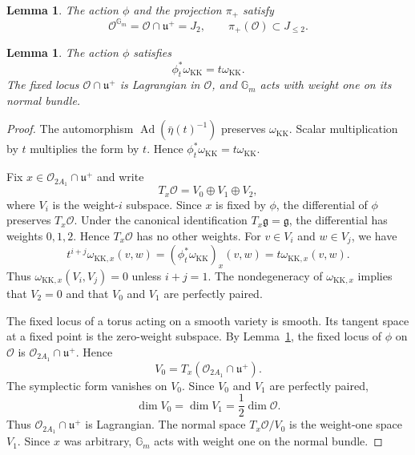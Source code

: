 \documentclass[10pt,a4paper]{amsart}
\newtheorem{lemma}[theorem]{Lemma}
\DeclareMathOperator{\Ad}{Ad}
\begin{document}
\begin{lemma}\label{fixed-data}
The action \(\phi\) and the projection \(\pi_+\) satisfy
\[
    \mathcal O^{\mathbb G_m}=\mathcal O\cap\mathfrak u^+=J_2,
    \qquad
    \pi_+(\mathcal O)\subset J_{\leq2}.
\]
\end{lemma}

\begin{lemma}\label{symplectic-weights}
The action \(\phi\) satisfies
\[
    \phi_t^*\omega_{\mathrm{KK}}=t\omega_{\mathrm{KK}}.
\]
The fixed locus \(\mathcal O\cap\mathfrak u^+\) is Lagrangian in \(\mathcal O\), and
\(\mathbb G_m\) acts with weight one on its normal bundle.
\end{lemma}

\begin{proof}
The automorphism \(\Ad(\bar\eta(t)^{-1})\) preserves
\(\omega_{\mathrm{KK}}\). Scalar multiplication by \(t\) multiplies the
form by \(t\). Hence
\(\phi_t^*\omega_{\mathrm{KK}}=t\omega_{\mathrm{KK}}\).

Fix \(x\in\mathcal O_{2A_1}\cap\mathfrak u^+\) and write
\[
    T_x\mathcal O=V_0\oplus V_1\oplus V_2,
\]
where \(V_i\) is the weight-\(i\) subspace. Since \(x\) is fixed by
\(\phi\), the differential of \(\phi\) preserves \(T_x\mathcal O\). Under the
canonical identification \(T_x\mathfrak g=\mathfrak g\), the differential
has weights \(0,1,2\). Hence \(T_x\mathcal O\) has no other weights. For
\(v\in V_i\) and \(w\in V_j\), we have
\[
    t^{i+j}\omega_{\mathrm{KK},x}(v,w)
    = (\phi_t^*\omega_{\mathrm{KK}})_x(v,w)
    = t\omega_{\mathrm{KK},x}(v,w).
\]
Thus \(\omega_{\mathrm{KK},x}(V_i,V_j)=0\) unless \(i+j=1\).
The nondegeneracy of \(\omega_{\mathrm{KK},x}\) implies that \(V_2=0\)
and that \(V_0\) and \(V_1\) are perfectly paired.

The fixed locus of a torus acting on a smooth variety is smooth. Its tangent
space at a fixed point is the zero-weight subspace. By
Lemma~\ref{fixed-data}, the fixed locus of \(\phi\) on \(\mathcal O\) is
\(\mathcal O_{2A_1}\cap\mathfrak u^+\). Hence
\[
    V_0=T_x(\mathcal O_{2A_1}\cap\mathfrak u^+).
\]
The symplectic form vanishes on \(V_0\). Since \(V_0\) and \(V_1\) are
perfectly paired,
\[
    \dim V_0=\dim V_1=\frac12\dim\mathcal O.
\]
Thus \(\mathcal O_{2A_1}\cap\mathfrak u^+\) is Lagrangian. The normal space
\(T_x\mathcal O/V_0\) is the weight-one space \(V_1\). Since \(x\) was arbitrary,
\(\mathbb G_m\) acts with weight one on the normal bundle.
\end{proof}
\end{document}
